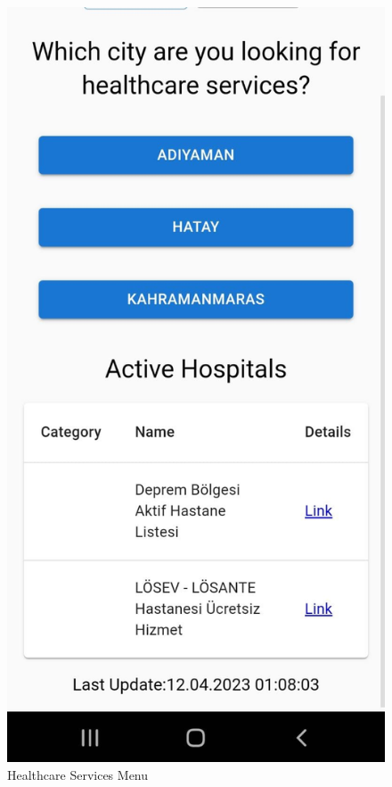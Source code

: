 \begin{figure}[H]
    \begin{center}
        \includegraphics[scale = 0.15]{assets/healthcareinterface.jpeg}
        \caption[Healthcare Services Menu]{Healthcare Services Menu}
    \end{center}
\end{figure}

